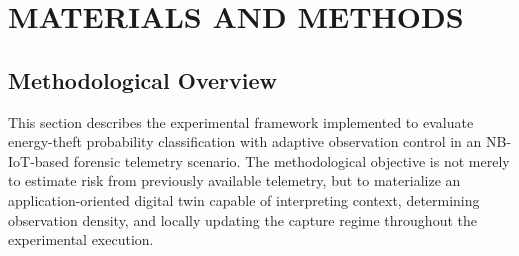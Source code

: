 \documentclass[journal]{IEEEtran}
\begin{document}
\section{MATERIALS AND METHODS} \label{sec:Materials_Methods}
\subsection{Methodological Overview}

This section describes the experimental framework implemented to evaluate energy-theft probability classification with adaptive observation control in an NB-IoT-based forensic telemetry scenario. The methodological objective is not merely to estimate risk from previously available telemetry, but to materialize an application-oriented digital twin capable of interpreting context, determining observation density, and locally updating the capture regime throughout the experimental execution.
\end{document}
